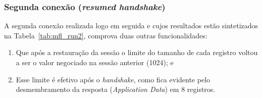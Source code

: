 
\subsubsection{Segunda conexão (\emph{resumed handshake})}

A segunda conexão realizada logo em seguida e cujos resultados estão sintetizados
na Tabela~\vref{tab:mfl_run2}, comprova duas outras 
funcionalidades:

\begin{enumerate}
\item Que após a restauração da sessão o limite do tamanho de cada registro 
voltou a ser o valor negociado na sessão anterior (1024); e
\item Esse limite é efetivo após o \emph{handshake}, como fica evidente pelo 
desmembramento da resposta (\emph{Application Data}) em 8 registros.
\end{enumerate}

